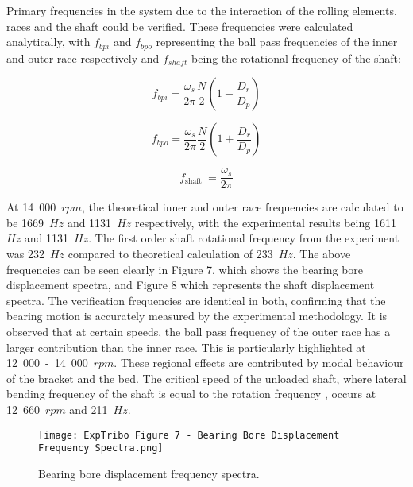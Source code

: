 Primary frequencies in the system due to the interaction of the rolling elements, races and the shaft could be verified. These frequencies were calculated analytically, with $f_{bpi}$ and $f_{bpo}$ representing the ball pass frequencies of the inner and outer race respectively and $f_{shaft}$ being the rotational frequency of the shaft:

\begin{equation}\label{ball pass frequency inner}
	f_{b p i}=\frac{\omega_s}{2 \pi} \frac{N}{2}\left(1-\frac{D_r}{D_p}\right)
\end{equation}

\begin{equation}\label{ball pass frequency outer}
	f_{b p o}=\frac{\omega_s}{2 \pi} \frac{N}{2}\left(1+\frac{D_r}{D_p}\right)
\end{equation}

\begin{equation}\label{ball pass frequency shaft}
	f_{\text {shaft }}=\frac{\omega_s}{2 \pi}
\end{equation}

At 14~000~$rpm$, the theoretical inner and outer race frequencies are calculated to be 1669~$Hz$ and 1131~$Hz$ respectively, with the experimental results being 1611~$Hz$ and 1131~$Hz$. The first order shaft rotational frequency from the experiment was 232~$Hz$ compared to theoretical calculation of 233~$Hz$. The above frequencies can be seen clearly in Figure 7, which shows the bearing bore displacement spectra, and Figure 8 which represents the shaft displacement spectra. The verification frequencies are identical in both, confirming that the bearing motion is accurately measured by the experimental methodology. It is observed that at certain speeds, the ball pass frequency of the outer race has a larger contribution than the inner race. This is particularly highlighted at 12~000~-~14~000~$rpm$. These regional effects are contributed by modal behaviour of the bracket and the bed. The critical speed of the unloaded shaft, where lateral bending frequency of the shaft is equal to the rotation frequency \cite{Shigley'sMechanicalEngineeringDesign}, occurs at 12~660~$rpm$ and 211~$Hz$.

\begin{figure}
	\centering
	\texttt{[image: ExpTribo Figure 7 - Bearing Bore Displacement Frequency Spectra.png]}
	\caption{Bearing bore displacement frequency spectra.}
	\label{Bearing bore displacement frequency spectra}
\end{figure}

